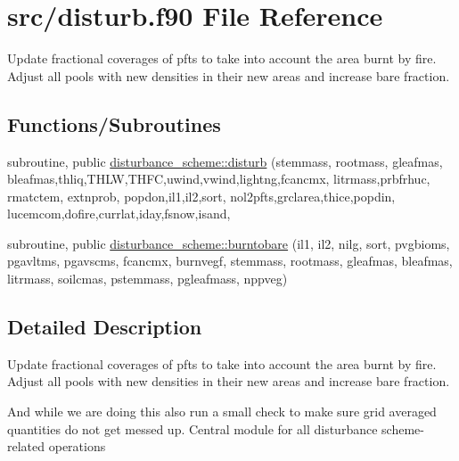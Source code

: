 \hypertarget{disturb_8f90}{}\section{src/disturb.f90 File Reference}
\label{disturb_8f90}


Update fractional coverages of pfts to take into account the area burnt by fire. Adjust all pools with new densities in their new areas and increase bare fraction.  


\subsection*{Functions/\+Subroutines}
{\bf }\par
\begin{DoxyCompactItemize}
\item 
subroutine, public \hyperlink{group__disturbance__scheme__disturb_ga43f1709a7ea90ed6c9c37f54c2f5478b}{disturbance\+\_\+scheme\+::disturb} (stemmass, rootmass, gleafmas, bleafmas,thliq,T\+H\+L\+W,T\+H\+F\+C,uwind,vwind,lightng,fcancmx, litrmass,prbfrhuc, rmatctem, extnprob, popdon,il1,il2,sort, nol2pfts,grclarea,thice,popdin, lucemcom,dofire,currlat,iday,fsnow,isand,
\end{DoxyCompactItemize}

{\bf }\par
\begin{DoxyCompactItemize}
\item 
subroutine, public \hyperlink{group__disturbance__scheme__burntobare_gae72fa0c94541c3e88a45d71f2442be9c}{disturbance\+\_\+scheme\+::burntobare} (il1, il2, nilg, sort, pvgbioms, pgavltms, pgavscms, fcancmx, burnvegf, stemmass, rootmass, gleafmas, bleafmas, litrmass, soilcmas, pstemmass, pgleafmass, nppveg)
\end{DoxyCompactItemize}



\subsection{Detailed Description}
Update fractional coverages of pfts to take into account the area burnt by fire. Adjust all pools with new densities in their new areas and increase bare fraction. 

And while we are doing this also run a small check to make sure grid averaged quantities do not get messed up. Central module for all disturbance scheme-\/related operations 